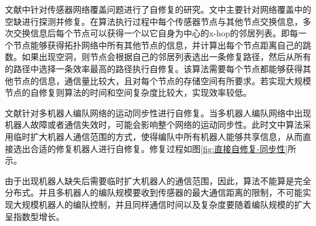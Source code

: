 文献\parencite{Auto-holeDetection}中针对传感器网络覆盖问题进行了自修复的研究。文中主要针对网络覆盖中的空缺进行探测并修复。在算法执行过程中每个传感器节点与其他节点交换信息，多次交换信息后每个节点可以获得一个以它自身为中心的x-hop的邻居列表。即每一个节点能够获得拓扑网络中所有其他节点的信息，并计算出每个节点距离自己的跳数。如果出现空洞，则节点会根据自己的邻居列表选出一条修复路径，然后从所有的路径中选择一条效率最高的路径执行自修复。该算法需要每个节点都能够获得其他节点的信息，通信量比较大，且对每个节点的存储空间有所要求。若实现大规模节点的自修复则算法的时间和空间复杂度比较大，实现效率较低。

文献\parencite{Zhang2006Motion}针对多机器人编队网络的运动同步性进行自修复。当多机器人编队网络中出现机器人故障或者通信失效时，可能会影响整个网络的运动同步性。此时文中算法采用临时扩大机器人通信范围的方式，使得编队中所有机器人能够共享信息，从而直接选出合适的修复机器人进行自修复。修复过程如图\ref{fig:直接自修复-同步性}所示。
\begin{figure*}[!htbp]
	\begin{multicols}{2}
		\begin{center}
		\end{center}
		\begin{center}
		\end{center}
		\begin{center}
		\end{center}
		\begin{center}
		\end{center}
	\end{multicols}
\end{figure*}
由于出现机器人缺失后需要临时扩大机器人的通信范围，因此，算法不能算是完全分布式。并且多机器人的编队规模要收到传感器的最大通信距离的限制，不可能实现大规模机器人的编队控制，并且同样通信时间以及复杂度要随着编队规模的扩大呈指数型增长。

